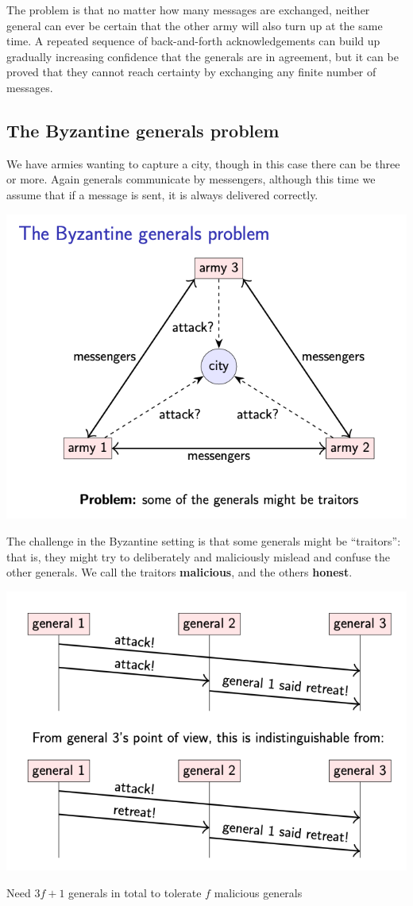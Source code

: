 \documentclass[11pt]{article}
\begin{document}
The problem is that no matter how many messages are exchanged, neither general can ever be
certain that the other army will also turn up at the same time. A repeated sequence of
back-and-forth acknowledgements can build up gradually increasing confidence that the generals
are in agreement, but it can be proved that they cannot reach certainty by exchanging any finite
number of messages.
\subsection{The Byzantine generals problem}
\label{sec:org4a29bee}
We have armies wanting to capture a city, though in this case there can be three or more. Again
generals communicate by messengers, although this time we assume that if a message is sent, it
is always delivered correctly.

\begin{center}
\includegraphics[width=.7\textwidth]{../images/DistributiveSystems/2.png}
\label{}
\end{center}

The challenge in the Byzantine setting is that some generals might be “traitors”: that is, they
might try to deliberately and maliciously mislead and confuse the other generals. We call the
traitors \textbf{malicious}, and the others \textbf{honest}.

\begin{center}
\includegraphics[width=.7\textwidth]{../images/DistributiveSystems/3.png}
\label{}
\end{center}
\begin{theorem}[]
Need \(3f+1\) generals in total to tolerate \(f\) malicious generals
\end{theorem}
\end{document}
